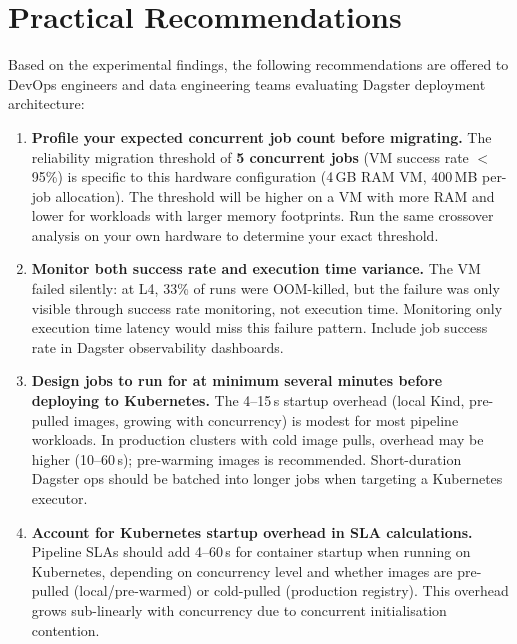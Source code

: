 
\section{Practical Recommendations}
\label{sec:recommendations}

Based on the experimental findings, the following recommendations are offered to DevOps engineers and data engineering teams evaluating Dagster deployment architecture:

\begin{enumerate}
  \item \textbf{Profile your expected concurrent job count before migrating.}
  The reliability migration threshold of \textbf{5 concurrent jobs} (VM success rate $<$95\%) is specific to this hardware configuration (4\,GB RAM VM, 400\,MB per-job allocation).
  The threshold will be higher on a VM with more RAM and lower for workloads with larger memory footprints.
  Run the same crossover analysis on your own hardware to determine your exact threshold.

  \item \textbf{Monitor both success rate and execution time variance.}
  The VM failed silently: at L4, 33\% of runs were OOM-killed, but the failure was only visible through success rate monitoring, not execution time.
  Monitoring only execution time latency would miss this failure pattern.
  Include job success rate in Dagster observability dashboards.

  \item \textbf{Design jobs to run for at minimum several minutes before deploying to Kubernetes.}
  The 4--15\,s startup overhead (local Kind, pre-pulled images, growing with concurrency) is modest for most pipeline workloads. In production clusters with cold image pulls, overhead may be higher (10--60\,s); pre-warming images is recommended.
  Short-duration Dagster ops should be batched into longer jobs when targeting a Kubernetes executor.

  \item \textbf{Account for Kubernetes startup overhead in SLA calculations.}
  Pipeline SLAs should add 4--60\,s for container startup when running on Kubernetes, depending on concurrency level and whether images are pre-pulled (local/pre-warmed) or cold-pulled (production registry).
  This overhead grows sub-linearly with concurrency due to concurrent initialisation contention.


\end{enumerate}
